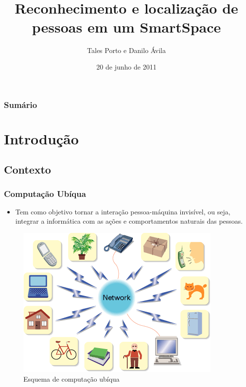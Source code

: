 \documentclass{beamer}
\title{Reconhecimento e localização de pessoas em um SmartSpace}
\author{Tales Porto e Danilo Ávila}
\institute[UnB]
{
    Instituto de Ciências Exatas\\
    Departamento de Ciência da Computação\\
    Universidade de Brasília
}
\date{20 de junho de 2011}
\begin{document}
\begin{frame}
\titlepage
\end{frame}


\begin{frame}
	\frametitle{Sumário}
	\tableofcontents
\end{frame}


\section{Introdução}

\subsection{Contexto}

\begin{frame}
    \frametitle{Computação Ubíqua}

	\begin{itemize}
  		\item Tem como objetivo tornar a interação pessoa-máquina invisível, ou seja, integrar a informática com as ações e comportamentos naturais das pessoas.
	\end{itemize}

    \begin{figure}[h]
    	\centering \includegraphics[scale=0.9]{figuras/ubiquitous.gif}
    	\caption{Esquema de computação ubíqua}
	\label{esquema_computacao_ubiqua} 
    \end{figure}
\end{frame}
\end{document}
